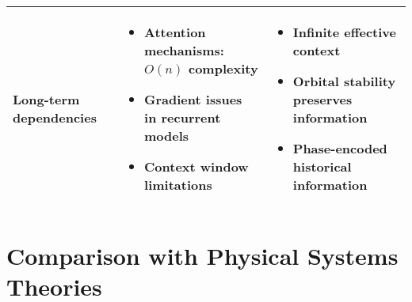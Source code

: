 \begin{center}
\begin{tabular}{|p{3cm}|p{5cm}|p{5cm}|}
\hline
Long-term dependencies & 
\begin{itemize}
    \item Attention mechanisms: $O(n)$ complexity
    \item Gradient issues in recurrent models
    \item Context window limitations
\end{itemize} &
\begin{itemize}
    \item Infinite effective context
    \item Orbital stability preserves information
    \item Phase-encoded historical information
\end{itemize} \\
\hline
\end{tabular}
\label{tab:ml_comparison}
\end{center}

\section{Comparison with Physical Systems Theories}

